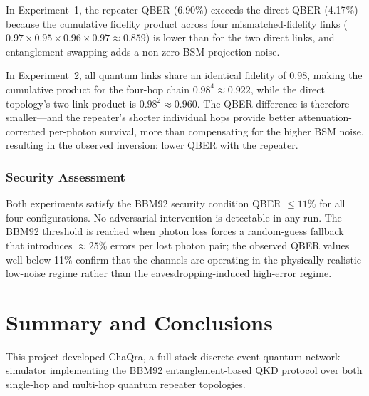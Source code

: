 \documentclass[12pt,oneside,letterpaper,english]{article}
\begin{document}
In Experiment~1, the repeater QBER (6.90\%) exceeds the direct QBER (4.17\%)
because the cumulative fidelity product across four mismatched-fidelity links
($0.97 \times 0.95 \times 0.96 \times 0.97 \approx 0.859$) is lower than for the
two direct links, and entanglement swapping adds a non-zero BSM projection noise.

In Experiment~2, all quantum links share an identical fidelity of 0.98,
making the cumulative product for the four-hop chain
$0.98^4 \approx 0.922$, while the direct topology's two-link product is
$0.98^2 \approx 0.960$. The QBER difference is therefore smaller—and the
repeater's shorter individual hops provide better attenuation-corrected
per-photon survival, more than compensating for the higher BSM noise,
resulting in the observed inversion: lower QBER with the repeater.

\subsubsection{Security Assessment}

Both experiments satisfy the BBM92 security condition QBER $\leq 11\%$ for all
four configurations. No adversarial intervention is detectable in any run.
The BBM92 threshold is reached when photon loss forces a random-guess fallback
that introduces $\approx 25\%$ errors per lost photon pair; the observed QBER
values well below 11\% confirm that the channels are operating in the
physically realistic low-noise regime rather than the eavesdropping-induced
high-error regime.

\section{Summary and Conclusions}

This project developed ChaQra, a full-stack discrete-event quantum network simulator implementing the BBM92 entanglement-based QKD protocol over both single-hop and multi-hop quantum repeater topologies.
\end{document}
